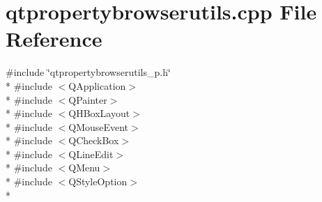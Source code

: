 \section{qtpropertybrowserutils.\+cpp File Reference}
\label{qtpropertybrowserutils_8cpp}
{\ttfamily \#include \char`\"{}qtpropertybrowserutils\+\_\+p.\+h\char`\"{}}\\*
{\ttfamily \#include $<$Q\+Application$>$}\\*
{\ttfamily \#include $<$Q\+Painter$>$}\\*
{\ttfamily \#include $<$Q\+H\+Box\+Layout$>$}\\*
{\ttfamily \#include $<$Q\+Mouse\+Event$>$}\\*
{\ttfamily \#include $<$Q\+Check\+Box$>$}\\*
{\ttfamily \#include $<$Q\+Line\+Edit$>$}\\*
{\ttfamily \#include $<$Q\+Menu$>$}\\*
{\ttfamily \#include $<$Q\+Style\+Option$>$}\\*
